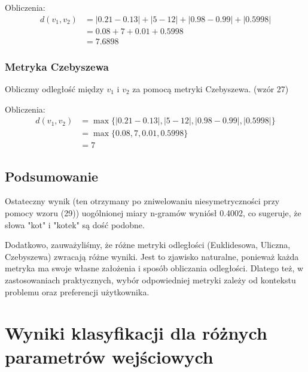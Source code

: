 \documentclass{article}
\begin{document}
Obliczenia:
\begin{equation}
\begin{split}
d(v_1, v_2) &= |0.21 - 0.13| + |5 - 12| + |0.98 - 0.99| + |0.5998| \\
&= 0.08 + 7 + 0.01 + 0.5998 \\
&= 7.6898
\end{split}
\end{equation}


\subsubsection*{Metryka Czebyszewa}

Obliczmy odległość między \( v_1 \) i \( v_2 \) za pomocą metryki Czebyszewa. (wzór 27) \newline


Obliczenia:
\begin{equation}
\begin{split}
d(v_1, v_2) &= \max\{|0.21 - 0.13|, |5 - 12|, |0.98 - 0.99|, |0.5998|\} \\
&= \max\{0.08, 7, 0.01, 0.5998\} \\
&= 7
\end{split}
\end{equation}

\subsection*{Podsumowanie}

Ostateczny wynik (ten otrzymany po zniwelowaniu niesymetryczności przy pomocy wzoru (29)) uogólnionej miary n-gramów wyniósł 0.4002, co sugeruje, że słowa "kot" i "kotek" są dość podobne. \newline

\noindent Dodatkowo, zauważyliśmy, że różne metryki odległości (Euklidesowa, Uliczna, Czebyszewa) zwracają różne wyniki. Jest to zjawisko naturalne, ponieważ każda metryka ma swoje własne założenia i sposób obliczania odległości. Dlatego też, w zastosowaniach praktycznych, wybór odpowiedniej metryki zależy od kontekstu problemu oraz preferencji użytkownika.







\section{Wyniki klasyfikacji dla różnych parametrów wejściowych}
\end{document}
